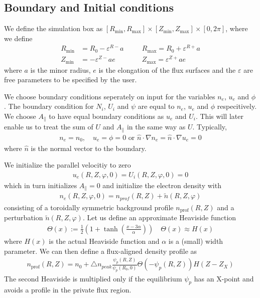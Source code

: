 \subsection{Boundary and Initial conditions}
We define the simulation box as
$[ R_{\min}, R_{\max}]\times [Z_{\min}, Z_{\max}] \times [0,2\pi]$,
where we define
\begin{align} \label{eq:box}
    R_{\min}&=R_0-\varepsilon^{R-}a\quad
    &&R_{\max}=R_0+\varepsilon^{R+}a\nonumber\\
    Z_{\min}&=-\varepsilon^{Z-}ae\quad
    &&Z_{\max}=\varepsilon^{Z+}ae
\end{align}
where $a$ is the minor radius, $e$ is the elongation of the flux surfaces and
the $\varepsilon$ are free parameters to be specified by the user.

We choose boundary conditions seperately on input for the variables
$n_e$, $u_e$ and $\phi$. The boundary condition for $N_i$, $U_i$ and
$\psi$ are equal to $n_e$, $u_e$ and $\phi$ respecitively.
We choose $A_\parallel$ to have equal boundary conditions as $u_e$ and $U_i$.
This will later enable us to treat the sum of $U$ and $A_\parallel$
in the same way as $U$.
Typically,
\begin{align}
n_e = n_0, \quad u_e = \phi = 0
\text{ or } \hat n \cdot \nabla n_e = \hat n \cdot \nabla u_e = 0
\end{align}
where $\hat n$ is the normal vector to the boundary.

We initialize the parallel velocitiy to zero
\begin{align}
  u_e(R,Z,\varphi,0) = U_i(R,Z,\varphi,0) = 0
  \label{}
\end{align}
which in turn initializes $A_\parallel = 0$
and initialize the electron density with
\begin{align} \label{eq:initial_ne}
    n_e(R,Z,\varphi, 0)= n_{prof}(R,Z) + \tilde n(R,Z,\varphi)
\end{align}
consisting of a toroidally symmetric background profile $n_{\text{prof}}(R,Z)$ and a perturbation
$\tilde n(R,Z,\varphi)$.
Let us define an approximate Heaviside function
\begin{align}
  \Theta(x) := \frac{1}{2}\left( 1 + \tanh\left( \frac{x-3\alpha}{ \alpha} \right) \right) \quad \Theta(x) \approx H(x)
  \label{eq:heaviside_profile}
\end{align}
where $H(x)$ is the actual Heaviside function and
$\alpha$ is a (small) width parameter.
We can then define a flux-aligned density profile as
\begin{align} \label{eq:density_profile}
  n_{\text{prof}}(R,Z)=
      n_0 + \triangle n_{peak}\frac{\psi_p(R,Z)}{\psi_p(R_0, 0)} \Theta( -\psi_p(R,Z)) H(Z-Z_X)
\end{align}
The second Heaviside is multiplied only if the equilibrium $\psi_p$ has an
X-point and avoids a profile in the private flux region.

